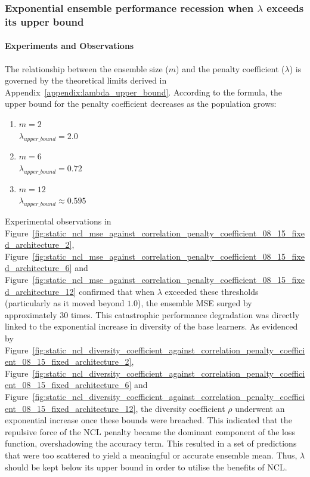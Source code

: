 \documentclass{article}
\begin{document}
\subsubsection{Exponential ensemble performance recession when $\lambda$ exceeds its upper bound}
\paragraph{Experiments and Observations}
The relationship between the ensemble size ($m$) and the penalty coefficient ($\lambda$) is governed by the theoretical limits derived in Appendix~\ref{appendix:lambda_upper_bound}. According to the formula, the upper bound for the penalty coefficient decreases as the population grows: 

\begin{enumerate}
    \item \textbf{$m = 2$} \\
    $\lambda_{upper\_bound} = 2.0$

    \item \textbf{$m = 6$} \\
    $\lambda_{upper\_bound} = 0.72$

    \item \textbf{$m = 12$} \\
    $\lambda_{upper\_bound} \approx 0.595$
\end{enumerate}

Experimental observations in Figure~\ref{fig:static_ncl_mse_against_correlation_penalty_coefficient_08_15_fixed_architecture_2}, Figure~\ref{fig:static_ncl_mse_against_correlation_penalty_coefficient_08_15_fixed_architecture_6} and Figure~\ref{fig:static_ncl_mse_against_correlation_penalty_coefficient_08_15_fixed_architecture_12} confirmed that when $\lambda$ exceeded these thresholds (particularly as it moved beyond $1.0$), the ensemble MSE surged by approximately 30 times. This catastrophic performance degradation was directly linked to the exponential increase in diversity of the base learners. As evidenced by Figure~\ref{fig:static_ncl_diversity_coefficient_against_correlation_penalty_coefficient_08_15_fixed_architecture_2}, Figure~\ref{fig:static_ncl_diversity_coefficient_against_correlation_penalty_coefficient_08_15_fixed_architecture_6} and Figure~\ref{fig:static_ncl_diversity_coefficient_against_correlation_penalty_coefficient_08_15_fixed_architecture_12}, the diversity coefficient $\rho$ underwent an exponential increase once these bounds were breached. This indicated that the repulsive force of the NCL penalty became the dominant component of the loss function, overshadowing the accuracy term. This resulted in a set of predictions that were too scattered to yield a meaningful or accurate ensemble mean. Thus, $\lambda$ should be kept below its upper bound in order to utilise the benefits of NCL. 
\end{document}
